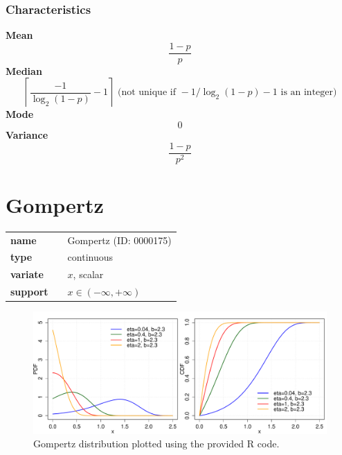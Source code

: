 \subsubsection*{Characteristics}
\smallskip \noindent \hspace{.2cm} \textbf{Mean} 
\begin{equation*}\frac{1-p}{p}\end{equation*}
\smallskip \noindent \hspace{.2cm} \textbf{Median} 
\begin{equation*}\left\lceil \frac{-1}{\log_2(1-p)}-1 \right\rceil \text{ (not unique if } -1/\log_2(1-p)-1 \text{ is an integer)}\end{equation*}
\smallskip \noindent \hspace{.2cm} \textbf{Mode} 
\begin{equation*}0\end{equation*}
\smallskip \noindent \hspace{.2cm} \textbf{Variance} 
\begin{equation*}\frac{1-p}{p^2}\end{equation*}
\smallskip
\section*{Gompertz} 

  \bigskip 

\begin{tabular}{p{2cm}cl}
\textbf{name} & & Gompertz (ID: 0000175)\\ 
 
\textbf{type} & & continuous \\ 

\textbf{variate} & & $x$, scalar \\ 

\textbf{support} & & $x \in (-\infty,+\infty)$
\end{tabular}

\begin{figure}[ht!]
\centering
  \includegraphics[width=140mm]{pics/Gompertz.pdf}
 \caption{Gompertz distribution plotted using the provided R code.}
 \label{fig:Gompertz}
\end{figure}

